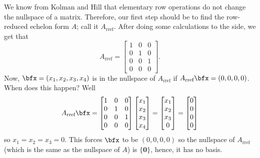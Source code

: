 \begin{questions}
\begin{parts}
    \begin{solution}
      We know from Kolman and Hill that elementary row operations do not
      change the nullspace of a matrix. Therefore, our first step should be
      to find the row-reduced echelon form $A$; call it
      $A_{\text{rref}}$. After doing some calculations to the side, we get
      that
      \[
        A_{\text{rref}}=
        \begin{bmatrix}
          1&0&0\\
          0&1&0\\
          0&0&1\\
          0&0&0
        \end{bmatrix}.
      \]
      Now, $\bfx=(x_1,x_2,x_3,x_4)$ is in the nullspace of
      $A_{\text{rref}}$ if $A_{\text{rref}}\bfx=(0,0,0,0)$. When does this
      happen? Well
      \[
        A_{\text{rref}}\bfx=%
        \begin{bmatrix}
          1&0&0\\
          0&1&0\\
          0&0&1\\
          0&0&0
        \end{bmatrix}
        \begin{bmatrix}
          x_1\\x_2\\x_3\\x_4
        \end{bmatrix}=
        \begin{bmatrix}
          x_1\\x_2\\x_3\\0
        \end{bmatrix}
        =\begin{bmatrix}
          0\\0\\0\\0
        \end{bmatrix}
      \]
      so $x_1=x_2=x_3=0$. This forces $\bfx$ to be $(0,0,0,0)$ so the
      nullspace of $A_{\text{rref}}$ (which is the same as the nullspace of
      $A$) is $\{\mathbf{0}\}$, hence, it has no basis.
    \end{solution}

\end{parts}
\end{questions}
